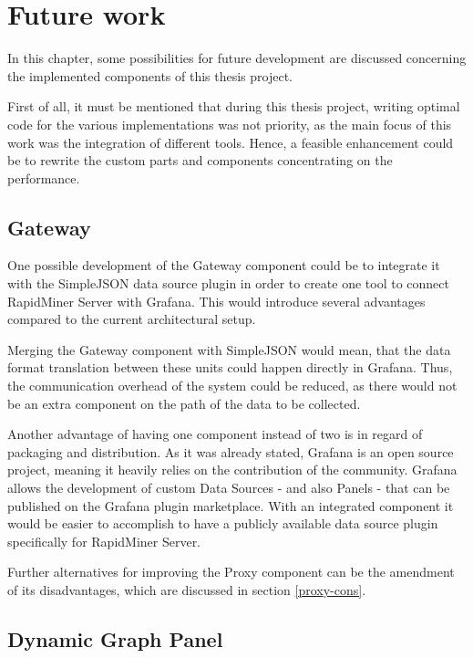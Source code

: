 \chapter{Future work}

In this chapter, some possibilities for future development are discussed concerning the implemented components of this thesis project.

First of all, it must be mentioned that during this thesis project, writing optimal code for the various implementations was not priority, as the main focus of this work was the integration of different tools. Hence, a feasible enhancement could be to rewrite the custom parts and components concentrating on the performance.

\section{Gateway}

One possible development of the Gateway component could be to integrate it with the SimpleJSON data source plugin in order to create one tool to connect RapidMiner Server with Grafana. This would introduce several advantages compared to the current architectural setup.

Merging the Gateway component with SimpleJSON would mean, that the data format translation between these units could happen directly in Grafana. Thus, the communication overhead of the system could be reduced, as there would not be an extra component on the path of the data to be collected.



Another advantage of having one component instead of two is in regard of packaging and distribution. As it was already stated, Grafana is an open source project, meaning it heavily relies on the contribution of the community. Grafana allows the development of custom Data Sources - and also Panels - that can be published on the Grafana plugin marketplace. With an integrated component it would be easier to accomplish to have a publicly available data source plugin specifically for RapidMiner Server.

Further alternatives for improving the Proxy component can be the amendment of its disadvantages, which are discussed in section \ref{proxy-cons}.

\section{Dynamic Graph Panel}

